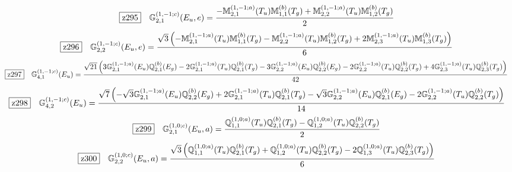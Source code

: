 \documentclass[fleqn,10pt,landscape]{jsarticle}
\begin{document}
\begin{dmath*}
\hspace*{3mm}\fbox{z295}\quad \mathbb{G}_{2,1}^{(1,-1;c)}(E_{u},e)=\frac{- \mathbb{M}_{2,1}^{(1,-1;a)}(T_{u}) \mathbb{M}_{1,1}^{(b)}(T_{g}) + \mathbb{M}_{2,2}^{(1,-1;a)}(T_{u}) \mathbb{M}_{1,2}^{(b)}(T_{g})}{2}
\end{dmath*}
\begin{dmath*}
\hspace*{3mm}\fbox{z296}\quad \mathbb{G}_{2,2}^{(1,-1;c)}(E_{u},e)=\frac{\sqrt{3} \left(- \mathbb{M}_{2,1}^{(1,-1;a)}(T_{u}) \mathbb{M}_{1,1}^{(b)}(T_{g}) - \mathbb{M}_{2,2}^{(1,-1;a)}(T_{u}) \mathbb{M}_{1,2}^{(b)}(T_{g}) + 2 \mathbb{M}_{2,3}^{(1,-1;a)}(T_{u}) \mathbb{M}_{1,3}^{(b)}(T_{g})\right)}{6}
\end{dmath*}
\begin{dmath*}
\hspace*{3mm}\fbox{z297}\quad \mathbb{G}_{4,1}^{(1,-1;c)}(E_{u})=\frac{\sqrt{21} \left(3 \mathbb{G}_{2,1}^{(1,-1;a)}(E_{u}) \mathbb{Q}_{2,1}^{(b)}(E_{g}) - 2 \mathbb{G}_{2,1}^{(1,-1;a)}(T_{u}) \mathbb{Q}_{2,1}^{(b)}(T_{g}) - 3 \mathbb{G}_{2,2}^{(1,-1;a)}(E_{u}) \mathbb{Q}_{2,2}^{(b)}(E_{g}) - 2 \mathbb{G}_{2,2}^{(1,-1;a)}(T_{u}) \mathbb{Q}_{2,2}^{(b)}(T_{g}) + 4 \mathbb{G}_{2,3}^{(1,-1;a)}(T_{u}) \mathbb{Q}_{2,3}^{(b)}(T_{g})\right)}{42}
\end{dmath*}
\begin{dmath*}
\hspace*{3mm}\fbox{z298}\quad \mathbb{G}_{4,2}^{(1,-1;c)}(E_{u})=\frac{\sqrt{7} \left(- \sqrt{3} \mathbb{G}_{2,1}^{(1,-1;a)}(E_{u}) \mathbb{Q}_{2,2}^{(b)}(E_{g}) + 2 \mathbb{G}_{2,1}^{(1,-1;a)}(T_{u}) \mathbb{Q}_{2,1}^{(b)}(T_{g}) - \sqrt{3} \mathbb{G}_{2,2}^{(1,-1;a)}(E_{u}) \mathbb{Q}_{2,1}^{(b)}(E_{g}) - 2 \mathbb{G}_{2,2}^{(1,-1;a)}(T_{u}) \mathbb{Q}_{2,2}^{(b)}(T_{g})\right)}{14}
\end{dmath*}
\begin{dmath*}
\hspace*{3mm}\fbox{z299}\quad \mathbb{G}_{2,1}^{(1,0;c)}(E_{u},a)=\frac{\mathbb{Q}_{1,1}^{(1,0;a)}(T_{u}) \mathbb{Q}_{2,1}^{(b)}(T_{g}) - \mathbb{Q}_{1,2}^{(1,0;a)}(T_{u}) \mathbb{Q}_{2,2}^{(b)}(T_{g})}{2}
\end{dmath*}
\begin{dmath*}
\hspace*{3mm}\fbox{z300}\quad \mathbb{G}_{2,2}^{(1,0;c)}(E_{u},a)=\frac{\sqrt{3} \left(\mathbb{Q}_{1,1}^{(1,0;a)}(T_{u}) \mathbb{Q}_{2,1}^{(b)}(T_{g}) + \mathbb{Q}_{1,2}^{(1,0;a)}(T_{u}) \mathbb{Q}_{2,2}^{(b)}(T_{g}) - 2 \mathbb{Q}_{1,3}^{(1,0;a)}(T_{u}) \mathbb{Q}_{2,3}^{(b)}(T_{g})\right)}{6}
\end{dmath*}
\end{document}
